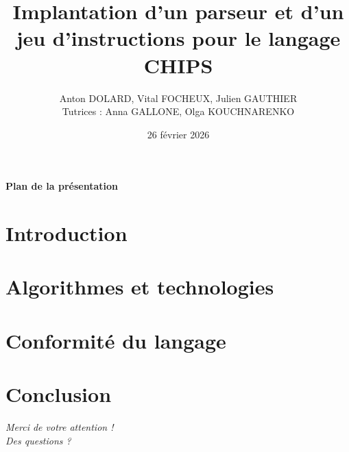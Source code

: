\documentclass[UTF8]{ctexbeamer}
\title{Implantation d'un parseur et d'un jeu d'instructions pour le langage CHIPS}
\author{\vspace{-5}Anton DOLARD, Vital FOCHEUX, Julien GAUTHIER \\
        Tutrices : Anna GALLONE, Olga KOUCHNARENKO}
\date{26 février 2026}
\begin{document}
\maketitle

\footlinecolor{}
\begin{frame}[noframenumbering]{}
    \framesubtitle{Plan de la présentation}
    \tableofcontents
\end{frame}
\themecolor{}


\section{Introduction}


\section{Algorithmes et technologies}


\section{Conformité du langage}


\section{Conclusion}


\begingroup
  \begin{frame}[c]
    \centering
    \begin{minipage}{\textwidth}
      \centering
      \Huge \textsl{Merci de votre attention ! } \\
      \Huge \textsl{Des questions ?}
    \end{minipage}
  \end{frame}
\endgroup
\end{document}
